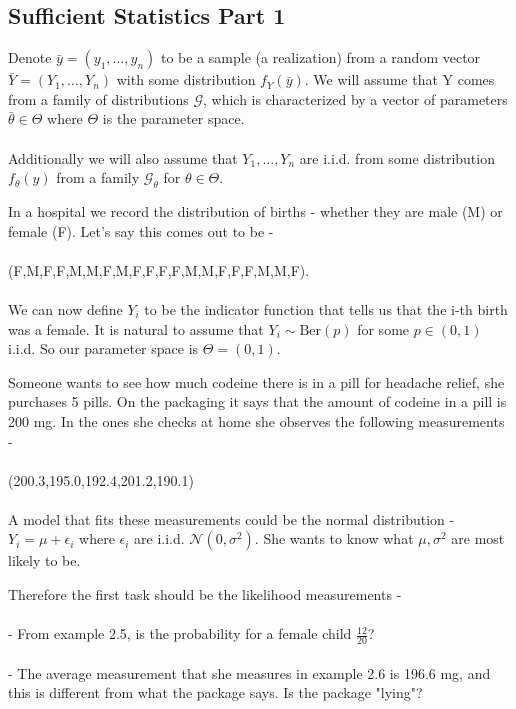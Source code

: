 \documentclass[../main.tex]{subfiles}
\begin{document}
\subsection{Sufficient Statistics Part 1}
Denote $\bar{y} = (y_1,\dots,y_n)$ to be a sample (a realization) from a random vector $\bar{Y}=(Y_1,\dots,Y_n)$ with some distribution $f_Y(\bar{y})$. We will assume that Y comes from a family of distributions $\mathcal{G}$, which is characterized by a vector of parameters $\bar{\theta}\in\Theta$ where $\Theta$ is the parameter space.  \\\\
Additionally we will also assume that $Y_1,\dots,Y_n$ are i.i.d. from some distribution $f_\theta(y)$ from a family $\mathcal{G}_{\theta}$ for $\theta\in\Theta$.
\begin{example}
\label{Bernoulli}
In a hospital we record the distribution of births - whether they are male (M) or female (F). Let's say this comes out to be - \\\\
(F,M,F,F,M,M,F,M,F,F,F,F,M,M,F,F,F,M,M,F). \\\\
We can now define $Y_i$ to be the indicator function that tells us that the i-th birth was a female. It is natural to assume that $Y_i\sim \text{Ber}(p)$ for some $p\in(0,1)$ i.i.d. So our parameter space is $\Theta = (0,1)$. \end{example}
\begin{example} Someone wants to see how much codeine there is in a pill for headache relief, she purchases 5 pills. On the packaging it says that the amount of codeine in a pill is 200 mg. In the ones she checks at home she observes the following measurements - \\\\
(200.3,195.0,192.4,201.2,190.1) \\\\
A model that fits these measurements could be the normal distribution - $Y_i=\mu+\epsilon_i$ where $\epsilon_i$ are i.i.d. $\mathcal{N}(0,\sigma^2)$. She wants to know what $\mu,\sigma^2$ are most likely to be. \end{example}
Therefore the first task should be the likelihood measurements - \\\\
- From example 2.5, is the probability for a female child $\frac{12}{20}$? \\\\
- The average measurement that she measures in example 2.6 is 196.6 mg, and this is different from what the package says. Is the package "lying"?
\newpage
\end{document}
